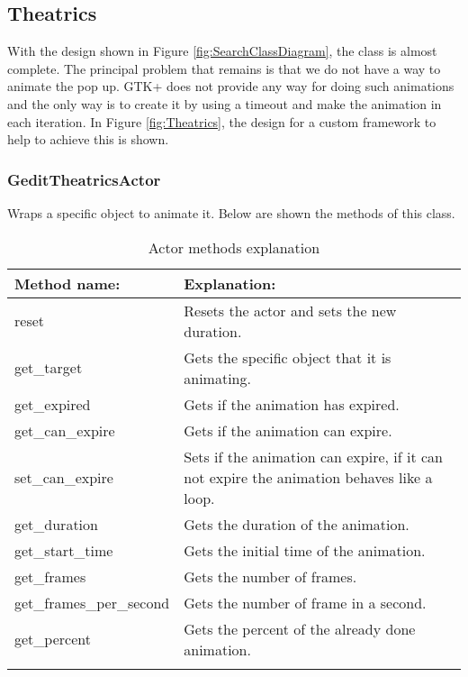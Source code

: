 \newpage
{}

\newpage
\subsection{Theatrics}\label{sec:Theatrics}

With the design shown in Figure \ref{fig:SearchClassDiagram}, the class is almost complete. The principal problem that remains is that we do not have a way to animate the pop up. GTK+ does not provide any way for doing such animations and the only way is to create it by using a timeout and make the animation in each iteration. In Figure \ref{fig:Theatrics}, the design for a custom framework to help to achieve this is shown.


\subsubsection{GeditTheatricsActor}

Wraps a specific object to animate it. Below are shown the methods of this class.

\begin{table}[H]
  \begin{center}
    \begin{tabularx}{\textwidth}{|X|X|}
      \firsthline
      \textbf{Method name:} & \textbf{Explanation:} \\
      \hline
      reset & Resets the actor and sets the new duration. \\
      \hline
      get\_target & Gets the specific object that it is animating. \\
      \hline
      get\_expired & Gets if the animation has expired. \\
      \hline
      get\_can\_expire & Gets if the animation can expire. \\
      \hline
      set\_can\_expire & Sets if the animation can expire, if it can not expire the animation behaves like a loop. \\
      \hline
      get\_duration & Gets the duration of the animation. \\
      \hline
      get\_start\_time & Gets the initial time of the animation. \\
      \hline
      get\_frames & Gets the number of frames. \\
      \hline
      get\_frames\_per\_second & Gets the number of frame in a second. \\
      \hline
      get\_percent & Gets the percent of the already done animation. \\
      \lasthline
    \end{tabularx}
    \caption{Actor methods explanation}
  \end{center}
\end{table}

